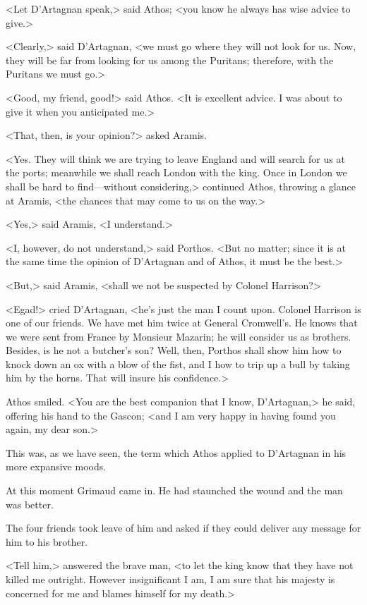 <Let D'Artagnan speak,> said Athos; <you know he always has wise advice to give.>

<Clearly,> said D'Artagnan, <we must go where they will not look for us. Now, they will be far from looking for us among the Puritans; therefore, with the Puritans we must go.>

<Good, my friend, good!> said Athos. <It is excellent advice. I was about to give it when you anticipated me.>

<That, then, is your opinion?> asked Aramis.

<Yes. They will think we are trying to leave England and will search for us at the ports; meanwhile we shall reach London with the king. Once in London we shall be hard to find—without considering,> continued Athos, throwing a glance at Aramis, <the chances that may come to us on the way.>

<Yes,> said Aramis, <I understand.>

<I, however, do not understand,> said Porthos. <But no matter; since it is at the same time the opinion of D'Artagnan and of Athos, it must be the best.>

<But,> said Aramis, <shall we not be suspected by Colonel Harrison?>

<Egad!> cried D'Artagnan, <he's just the man I count upon. Colonel Harrison is one of our friends. We have met him twice at General Cromwell's. He knows that we were sent from France by Monsieur Mazarin; he will consider us as brothers. Besides, is he not a butcher's son? Well, then, Porthos shall show him how to knock down an ox with a blow of the fist, and I how to trip up a bull by taking him by the horns. That will insure his confidence.>

Athos smiled. <You are the best companion that I know, D'Artagnan,> he said, offering his hand to the Gascon; <and I am very happy in having found you again, my dear son.>

This was, as we have seen, the term which Athos applied to D'Artagnan in his more expansive moods.

At this moment Grimaud came in. He had staunched the wound and the man was better.

The four friends took leave of him and asked if they could deliver any message for him to his brother.

<Tell him,> answered the brave man, <to let the king know that they have not killed me outright. However insignificant I am, I am sure that his majesty is concerned for me and blames himself for my death.>

